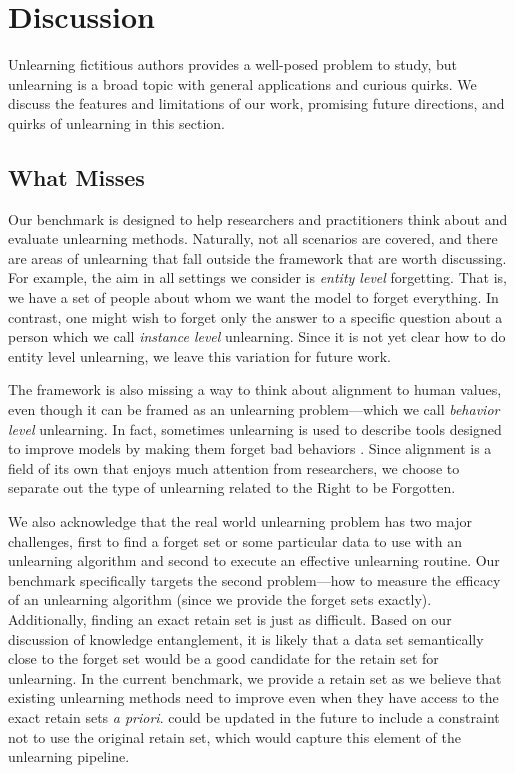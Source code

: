 \section{Discussion}
\label{sec:discussion}

Unlearning fictitious authors provides a well-posed problem to study, but unlearning is a broad topic with general applications and curious quirks.
We discuss the features and limitations of our work, promising future directions, and quirks of unlearning in this section.

\subsection{What \tofu{} Misses}
\label{sec:missing}

Our benchmark is designed to help researchers and practitioners think about and evaluate unlearning methods.
Naturally, not all scenarios are covered, and there are areas of unlearning that fall outside the \tofu{} framework that are worth discussing.
For example, the aim in all settings we consider is \emph{entity level} forgetting.
That is, we have a set of people about whom we want the model to forget everything.
In contrast, one might wish to forget only the answer to a specific question about a person which we call \emph{instance level} unlearning.
Since it is not yet clear how to do entity level unlearning, we leave this variation for future work.

The \tofu{} framework is also missing a way to think about alignment to human values, even though it can be framed as an unlearning problem---which we call \emph{behavior level} unlearning.
In fact, sometimes unlearning is used to describe tools designed to improve models by making them forget bad behaviors \citep{hu2023separate, yao2023large, lu2022quark}.
Since alignment is a field of its own that enjoys much attention from researchers, we choose to separate out the type of unlearning related to the Right to be Forgotten.

We also acknowledge that the real world unlearning problem has two major challenges, first to find a forget set or some particular data to use with an unlearning algorithm and second to execute an effective unlearning routine.
Our benchmark specifically targets the second problem---how to measure the efficacy of an unlearning algorithm (since we provide the forget sets exactly). 
Additionally, finding an exact retain set is just as difficult. %
Based on our discussion of knowledge entanglement, it is likely that a data set semantically close to the forget set would be a good candidate for the retain set for unlearning. 
In the current benchmark, we provide a retain set as we believe that existing unlearning methods need to improve even when they have access to the exact retain sets \emph{a priori}.
\tofu{} could be updated in the future to include a constraint not to use the original retain set, which would capture this element of the unlearning pipeline. 

